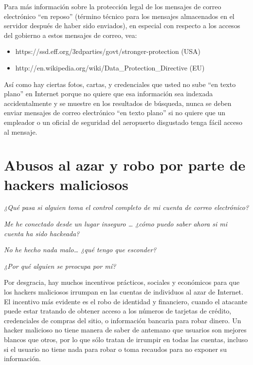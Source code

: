 \documentclass[10pt,a5paper,twoside,,]{book}
\providecommand{\tightlist}{%
  \setlength{\itemsep}{0pt}\setlength{\parskip}{0pt}}
\begin{document}
Para más información sobre la protección legal de los mensajes de correo
electrónico ``en reposo'' (término técnico para los mensajes almacenados
en el servidor después de haber sido enviados), en especial con respecto
a los accesos del gobierno a estos mensajes de correo, vea:

\begin{itemize}
\tightlist
\item
  https://ssd.eff.org/3rdparties/govt/stronger-protection (USA)
\item
  http://en.wikipedia.org/wiki/Data\_Protection\_Directive (EU)
\end{itemize}

Así como hay ciertas fotos, cartas, y credenciales que usted no sube
``en texto plano'' en Internet porque no quiere que esa información sea
indexada accidentalmente y se muestre en los resultados de búsqueda,
nunca se deben enviar mensajes de correo electrónico ``en texto plano''
si no quiere que un empleador o un oficial de seguridad del aeropuerto
disgustado tenga fácil acceso al mensaje.

\section{Abusos al azar y robo por parte de hackers
maliciosos}\label{abusos-al-azar-y-robo-por-parte-de-hackers-maliciosos}

\emph{¿Qué pasa si alguien toma el control completo de mi cuenta de
correo electrónico?}

\emph{Me he conectado desde un lugar inseguro \ldots{} ¿cómo puedo saber
ahora si mi cuenta ha sido hackeada?}

\emph{No he hecho nada malo\ldots{} ¿qué tengo que esconder?}

\emph{¿Por qué alguien se preocupa por mí?}

Por desgracia, hay muchos incentivos prácticos, sociales y económicos
para que los hackers maliciosos irrumpan en las cuentas de individuos al
azar de Internet. El incentivo más evidente es el robo de identidad y
financiero, cuando el atacante puede estar tratando de obtener acceso a
los números de tarjetas de crédito, credenciales de compras del sitio, o
información bancaria para robar dinero. Un hacker malicioso no tiene
manera de saber de antemano que usuarios son mejores blancos que otros,
por lo que sólo tratan de irrumpir en todas las cuentas, incluso si el
usuario no tiene nada para robar o toma recaudos para no exponer su
información.
\end{document}
